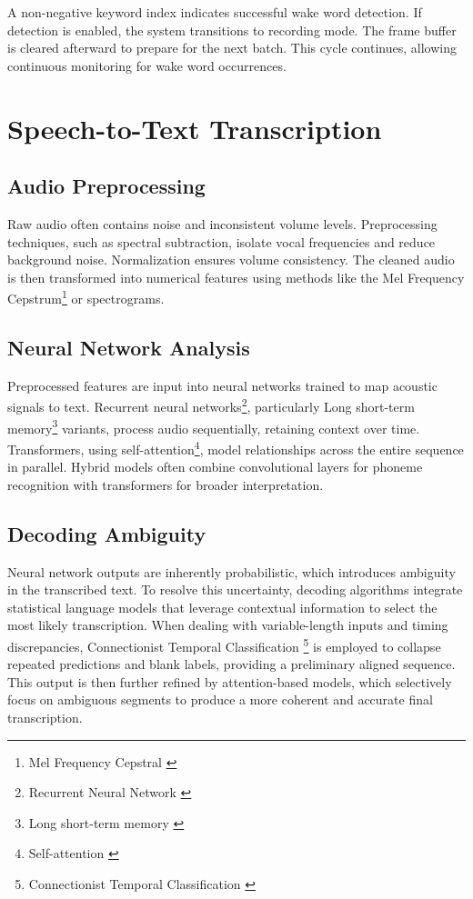 A non-negative keyword index indicates successful wake word detection.
If detection is enabled, the system transitions to recording mode.
The frame buffer is cleared afterward to prepare for the next batch.
This cycle continues, allowing continuous monitoring for wake word occurrences.

\section{Speech-to-Text Transcription}

\subsection{Audio Preprocessing}
Raw audio often contains noise and inconsistent volume levels.
Preprocessing techniques, such as spectral subtraction, isolate vocal frequencies and reduce background noise.
Normalization ensures volume consistency.
The cleaned audio is then transformed into numerical features
using methods like the Mel Frequency Cepstrum\footnote{Mel Frequency Cepstral \cite{mfc}} or spectrograms.

\subsection{Neural Network Analysis}
Preprocessed features are input into neural networks trained to map acoustic signals to text.
Recurrent neural networks\footnote{Recurrent Neural Network \cite{rnn}},
particularly Long short-term memory\footnote{Long short-term memory \cite{lstm}} variants, process audio sequentially, retaining context over time.
Transformers, using self-attention\footnote{Self-attention \cite{self-attention}}, model relationships across the entire sequence in parallel.
Hybrid models often combine convolutional layers for phoneme recognition with transformers for broader interpretation.

\subsection{Decoding Ambiguity}
Neural network outputs are inherently probabilistic, which introduces ambiguity in the transcribed text.
To resolve this uncertainty, decoding algorithms integrate statistical language models
that leverage contextual information to select the most likely transcription.
When dealing with variable-length inputs and timing discrepancies,
Connectionist Temporal Classification \footnote{Connectionist Temporal Classification \cite{ctc}}
is employed to collapse repeated predictions and blank labels, providing a preliminary aligned sequence.
This output is then further refined by attention-based models,
which selectively focus on ambiguous segments to produce a more coherent and accurate final transcription.

